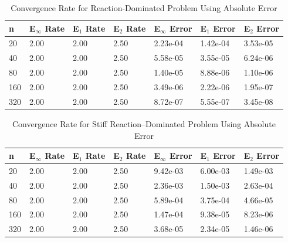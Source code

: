 \begin{table}[h]
   \caption{\label{tab:diffusion_spatial_convergence_reaction_dom} Convergence Rate for Reaction-Dominated Problem Using Absolute Error}
   \centering
   \begin{tabular}{lllllll}
   \hline
    n & E${}_{\infty}$ Rate & E${}_{1}$ Rate & E${}_{2}$ Rate & E${}_{\infty}$ Error & E${}_{1}$ Error & E${}_{2}$ Error\\
   \hline
    20 & 2.00 & 2.00 & 2.50 & 2.23e-04 & 1.42e-04 & 3.53e-05 \\  
    40 & 2.00 & 2.00 & 2.50 & 5.58e-05 & 3.55e-05 & 6.24e-06 \\  
    80 & 2.00 & 2.00 & 2.50 & 1.40e-05 & 8.88e-06 & 1.10e-06 \\  
   160 & 2.00 & 2.00 & 2.50 & 3.49e-06 & 2.22e-06 & 1.95e-07 \\  
   320 & 2.00 & 2.00 & 2.50 & 8.72e-07 & 5.55e-07 & 3.45e-08 \\  
   \hline
   \end{tabular}
\end{table}

\begin{table}[h]
   \caption{\label{tab:diffusion_spatial_convergence_stiff_reaction_dom} Convergence Rate for Stiff Reaction--Dominated Problem Using Absolute Error}
   \centering
   \begin{tabular}{lllllll}
   \hline
    n & E${}_{\infty}$ Rate & E${}_{1}$ Rate & E${}_{2}$ Rate & E${}_{\infty}$ Error & E${}_{1}$ Error & E${}_{2}$ Error\\
   \hline
    20 & 2.00 & 2.00 & 2.50 & 9.42e-03 & 6.00e-03 & 1.49e-03 \\ 
    40 & 2.00 & 2.00 & 2.50 & 2.36e-03 & 1.50e-03 & 2.63e-04 \\ 
    80 & 2.00 & 2.00 & 2.50 & 5.89e-04 & 3.75e-04 & 4.66e-05 \\ 
   160 & 2.00 & 2.00 & 2.50 & 1.47e-04 & 9.38e-05 & 8.23e-06 \\ 
   320 & 2.00 & 2.00 & 2.50 & 3.68e-05 & 2.34e-05 & 1.46e-06 \\ 
   \hline
   \end{tabular}
\end{table}

\clearpage

